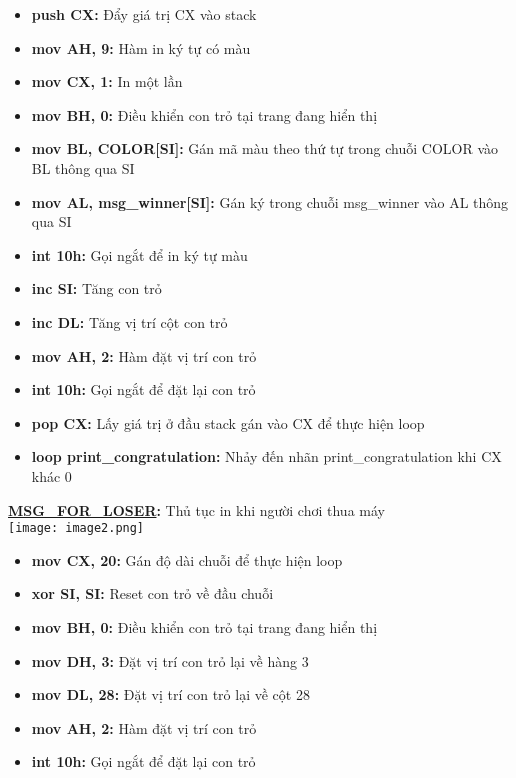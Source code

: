 \begin{itemize}
    \item \textbf{push CX:} Đẩy giá trị CX vào stack
    \item \textbf{mov AH, 9:} Hàm in ký tự có màu
    \item \textbf{mov CX, 1:} In một lần 
    \item \textbf{mov BH, 0:} Điều khiển con trỏ tại trang đang hiển thị 
    \item \textbf{mov BL, COLOR[SI]:} Gán mã màu theo thứ tự trong chuỗi COLOR vào BL  thông qua SI
    \item \textbf{mov AL, msg\_winner[SI]:} Gán ký trong chuỗi msg\_winner vào AL thông qua SI
    \item \textbf{int 10h:} Gọi ngắt để in ký tự màu
    \item \textbf{inc SI: }Tăng con trỏ
    \item \textbf{inc DL: }Tăng vị trí cột con trỏ 
    \item \textbf{mov AH, 2:} Hàm đặt vị trí con trỏ
    \item \textbf{int 10h:} Gọi ngắt để đặt lại con trỏ
    \item \textbf{pop CX: }Lấy giá trị ở đầu stack gán vào CX để thực hiện loop 
    \item \textbf{loop print\_congratulation:} Nhảy đến nhãn print\_congratulation khi CX khác 0 
\end{itemize}

\textbf{\underline{MSG\_FOR\_LOSER}: }Thủ tục in khi người chơi thua máy\\
\texttt{[image: image2.png]}
\begin{itemize}
    \item \textbf{mov CX, 20:} Gán độ dài chuỗi để thực hiện loop
    \item \textbf{xor SI, SI:} Reset con trỏ về đầu chuỗi
    \item \textbf{mov BH, 0: }Điều khiển con trỏ tại trang đang hiển thị 
    \item \textbf{mov DH, 3: }Đặt vị trí con trỏ lại về hàng 3
    \item \textbf{mov DL, 28:} Đặt vị trí con trỏ lại về cột 28
    \item \textbf{mov AH, 2: }Hàm đặt vị trí con trỏ
    \item \textbf{int 10h:} Gọi ngắt để đặt lại con trỏ
\end{itemize}

